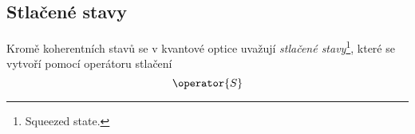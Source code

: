 \subsection{Stlačené stavy}
    Kromě koherentních stavů se v kvantové optice uvažují \emph{stlačené stavy}\footnote{Squeezed state.}, které se vytvoří pomocí operátoru stlačení
    \begin{equation}
        \operator{S}
    \end{equation}
